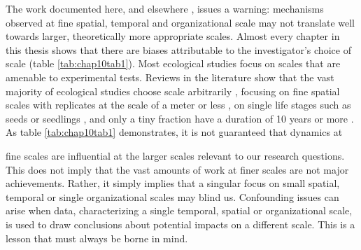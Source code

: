 \documentclass[b5paper,justified]{tufte-book} %
\begin{document}
\begin{fullwidth}
The work documented here, and elsewhere \citep[e.g.][]{DeKroon2016}, issues a warning: mechanisms observed at fine spatial, temporal and organizational scale may not translate well towards larger, theoretically more appropriate scales. Almost every chapter in this thesis shows that there are biases attributable to the investigator's choice of scale (table \ref{tab:chap10tab1}). Most ecological studies focus on scales that are amenable to experimental tests. Reviews in the literature show that the vast majority of ecological studies choose scale arbitrarily \citep{Wheatley2009}, focusing on fine spatial scales with replicates at the scale of a meter or less \citep{Kareiva1988, Gardner2001}, on single life stages such as seeds or seedlings \citep[e.g.][]{Comita2014}, and only a tiny fraction have a duration of 10 years or more \citep[e.g.][]{Salguero-Gomez2015}. As table \ref{tab:chap10tab1} demonstrates, it is not guaranteed that dynamics at \end{fullwidth} fine scales are influential at the larger scales relevant to our research questions. This does not imply that the vast amounts of work at finer scales are not major achievements. Rather, it simply implies that a singular focus on small spatial, temporal or single organizational scales may blind us. Confounding issues can arise when data, characterizing a single temporal, spatial or organizational scale, is used to draw conclusions about potential impacts on a different scale. This is a lesson that must always be borne in mind. 
\end{document}

